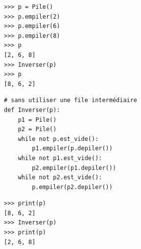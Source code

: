 \documentclass[a4paper,11pt]{article}
\theoremstyle{mytheor}
\begin{document}
\begin{Verbatim}[frame=leftline, framerule=1.5mm, rulecolor=\color{blue}]
>>> p = Pile()
>>> p.empiler(2)
>>> p.empiler(6)
>>> p.empiler(8)
>>> p
[2, 6, 8]
>>> Inverser(p)
>>> p
[8, 6, 2]
\end{Verbatim}

\begin{lstlisting}
# sans utiliser une file intermédiaire
def Inverser(p):
	p1 = Pile()
	p2 = Pile()
	while not p.est_vide():
		p1.empiler(p.depiler())
	while not p1.est_vide():
		p2.empiler(p1.depiler())
	while not p2.est_vide():
		p.empiler(p2.depiler())
\end{lstlisting}


\begin{Verbatim}[frame=leftline, framerule=1.5mm, rulecolor=\color{blue}]
>>> print(p)
[8, 6, 2]
>>> Inverser(p)
>>> print(p)
[2, 6, 8]
\end{Verbatim}
\end{document}

